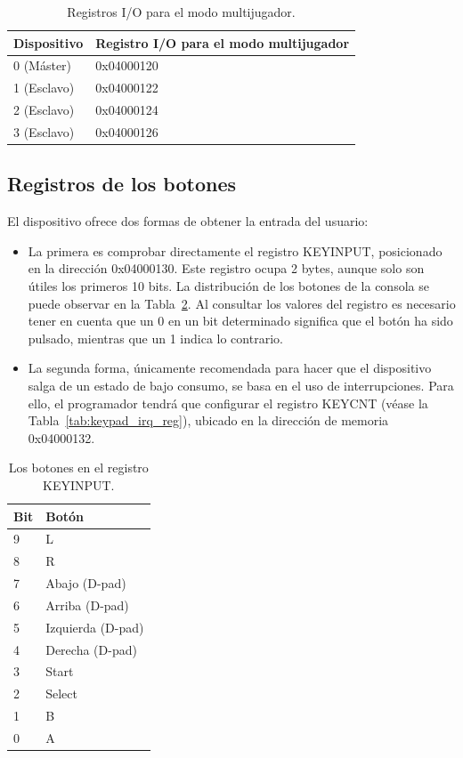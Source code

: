 \begin{table}[h]
	\centering
	\begin{tabular}{| l | l |}
		\hline
		\textbf{Dispositivo} & \textbf{Registro I/O para el modo multijugador} \\ \hline
		0 (Máster) &  0x04000120 \\ \hline
		1 (Esclavo) &  0x04000122 \\ \hline
		2 (Esclavo) &  0x04000124 \\ \hline
		3 (Esclavo) &  0x04000126 \\ \hline
	\end{tabular}
	\caption{Registros I/O para el modo multijugador.}\label{tab:mult_modo}
\end{table}
\FloatBarrier{}

\subsection{Registros de los botones}
El dispositivo ofrece dos formas de obtener la entrada del usuario:

\begin{itemize}
	\item La primera es comprobar directamente el registro KEYINPUT, posicionado en la dirección 0x04000130. Este registro ocupa 2 bytes, aunque solo son útiles los primeros 10 bits. La distribución de los botones de la consola se puede observar en la Tabla~\ref{tab:keypad_reg}. Al consultar los valores del registro es necesario tener en cuenta que un 0 en un bit determinado significa que el botón ha sido pulsado, mientras que un 1 indica lo contrario.
	\item La segunda forma, únicamente recomendada para hacer que el dispositivo salga de un estado de bajo consumo, se basa en el uso de interrupciones. Para ello, el programador tendrá que configurar el registro KEYCNT (véase la Tabla~\ref{tab:keypad_irq_reg}), ubicado en la dirección de memoria 0x04000132.
\end{itemize}

	\begin{table}[h]
		\centering
		\begin{tabular}{| l | l |}
			\hline
			\textbf{Bit} & \textbf{Botón} \\ \hline
			9 &  L \\ \hline
			8 &  R \\ \hline
			7 &  Abajo (D-pad) \\ \hline
			6 &  Arriba (D-pad) \\ \hline
			5 &  Izquierda (D-pad) \\ \hline
			4 &  Derecha (D-pad) \\ \hline
			3 &  Start \\ \hline
			2 &  Select \\ \hline
			1 &  B \\ \hline
			0 &  A \\ \hline
		\end{tabular}
		\caption{Los botones en el registro KEYINPUT.}\label{tab:keypad_reg}
	\end{table}


